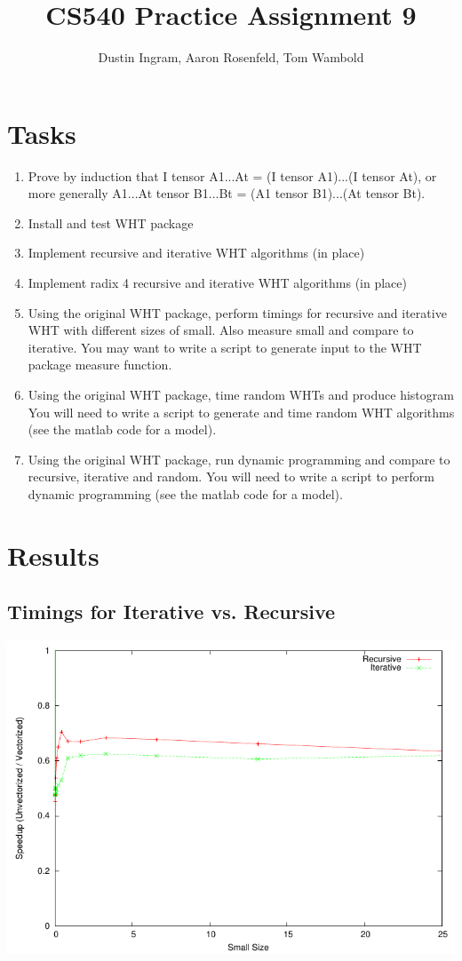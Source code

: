 \documentclass{article}
\title{CS540 Practice Assignment 9}
\author{Dustin Ingram, Aaron Rosenfeld, Tom Wambold}
\begin{document}
\maketitle
\newpage
\section{Tasks}
\begin{enumerate}
    \item Prove by induction that I tensor A1...At = (I tensor A1)...(I tensor At), or more generally A1...At tensor B1...Bt = (A1 tensor B1)...(At tensor Bt).
    \item Install and test WHT package
    \item Implement recursive and iterative WHT algorithms (in place)
    \item Implement radix 4 recursive and iterative WHT algorithms (in place)
    \item Using the original WHT package, perform timings for recursive and iterative WHT with different sizes of small. Also measure small and compare to iterative. You may want to write a script to generate input to the WHT package measure function.
    \item Using the original WHT package, time random WHTs and produce histogram You will need to write a script to generate and time random WHT algorithms (see the matlab code for a model).
    \item Using the original WHT package, run dynamic programming and compare to recursive, iterative and random. You will need to write a script to perform dynamic programming (see the matlab code for a model).
\end{enumerate}
\newpage
\section{Results}
\subsection{Timings for Iterative vs. Recursive}
  \includegraphics[width=\textwidth]{p6.pdf}
\end{document}

